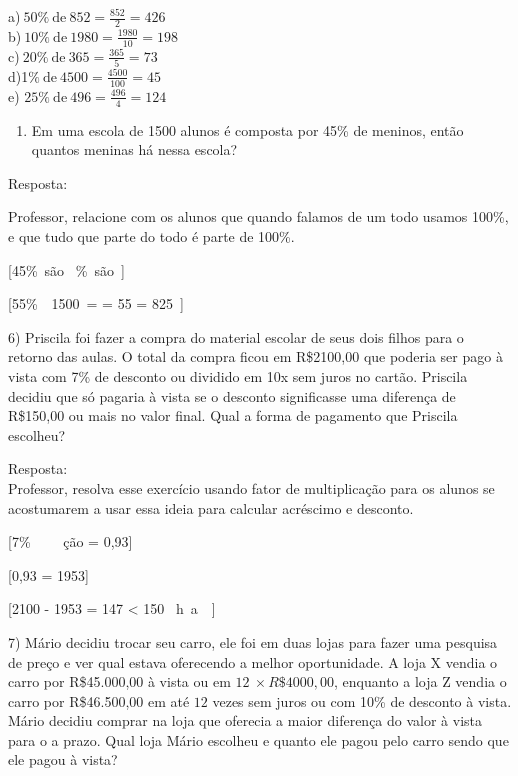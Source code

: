 a)\(\ 50\%\ \text{de}\ 852 = \frac{852}{2} = 426\)\\
b)\(\ 10\%\ \text{de}\ 1980 = \frac{1980}{10} = 198\)\\
c)\(\ 20\%\ \text{de}\ 365 = \frac{365}{5} = 73\)\\
d)1\(\%\ \text{de}\ 4500 = \frac{4500}{100} = 45\)\\
e) \(25\%\ \text{de}\ 496 = \frac{496}{4} = 124\)

\begin{enumerate}
\def\labelenumi{\arabic{enumi})}
\setcounter{enumi}{4}
\tightlist
\item
  Em uma escola de 1500 alunos é composta por 45\% de meninos, então
  quantos meninas há nessa escola?
\end{enumerate}

Resposta:

Professor, relacione com os alunos que quando falamos de um todo usamos
100\%, e que tudo que parte do todo é parte de 100\%.

[45\%\ são\  \%\ são\ ]

[55\%\ \ 1500\  =   = 55  = 825\ ]

6) Priscila foi fazer a compra do material escolar de seus dois filhos
para o retorno das aulas. O total da compra ficou em R\$2100,00 que
poderia ser pago à vista com 7\% de desconto ou dividido em 10x sem
juros no cartão. Priscila decidiu que só pagaria à vista se o desconto
significasse uma diferença de R\$150,00 ou mais no valor final. Qual a
forma de pagamento que Priscila escolheu?

Resposta:\\
Professor, resolva esse exercício usando fator de multiplicação para os
alunos se acostumarem a usar essa ideia para calcular acréscimo e
desconto.

[7\%\ \  \rightarrow {}\ \ ção = 0,93]

[0,93  = 1953]

[2100 - 1953 = 147 < 150 \rightarrow {}\ h\ a\ \ ]

7) Mário decidiu trocar seu carro, ele foi em duas lojas para fazer uma
pesquisa de preço e ver qual estava oferecendo a melhor oportunidade. A
loja X vendia o carro por R\$45.000,00 à vista ou em
\(12\  \times R\$ 4000,00\), enquanto a loja Z vendia o carro por
R\$46.500,00 em até \(12\) vezes sem juros ou com 10\% de desconto à
vista. Mário decidiu comprar na loja que oferecia a maior diferença do
valor à vista para o a prazo. Qual loja Mário escolheu e quanto ele
pagou pelo carro sendo que ele pagou à vista?

